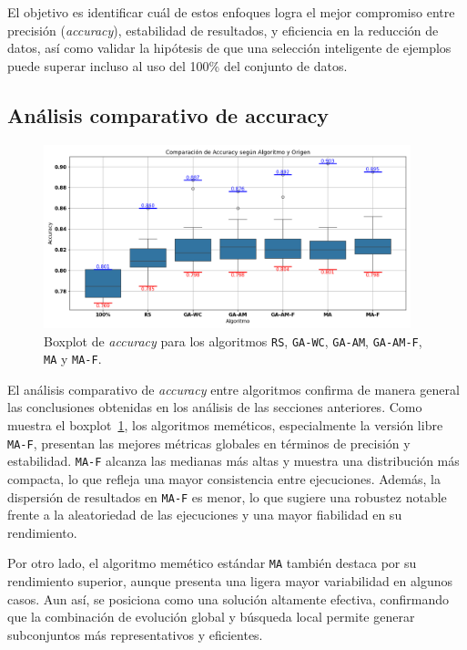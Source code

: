 El objetivo es identificar cuál de estos enfoques logra el mejor compromiso entre precisión (\textit{accuracy}),
estabilidad de resultados, y eficiencia en la reducción de datos, así como validar la hipótesis de que una selección inteligente de ejemplos puede superar incluso al uso del 100\% del conjunto de datos.

\subsection{Análisis comparativo de accuracy}\label{sec:comparacion-final-accuracy}
\begin{figure}[htp]
  \centering
  \includegraphics[width=0.95\textwidth]{imagenes/evaluaciones/final/boxplot-por-algoritmo.png}
  \caption{Boxplot de \textit{accuracy} para los algoritmos \texttt{RS}, \texttt{GA-WC}, \texttt{GA-AM}, \texttt{GA-AM-F}, \texttt{MA} y \texttt{MA-F}.}
  \label{fig:boxplot-comparacion-final}
\end{figure}
El análisis comparativo de \textit{accuracy} entre algoritmos confirma de manera general las conclusiones obtenidas en los análisis de las secciones anteriores.
Como muestra el boxplot~\ref{fig:boxplot-comparacion-final}, los algoritmos meméticos, especialmente la versión libre \texttt{MA-F},
presentan las mejores métricas globales en términos de precisión y estabilidad.
\texttt{MA-F} alcanza las medianas más altas y muestra una distribución más compacta, lo que refleja una mayor consistencia entre ejecuciones.
Además, la dispersión de resultados en \texttt{MA-F} es menor, lo que sugiere una robustez notable frente a la aleatoriedad de las ejecuciones y una mayor fiabilidad en su rendimiento.

Por otro lado, el algoritmo memético estándar \texttt{MA} también destaca por su rendimiento superior,
aunque presenta una ligera mayor variabilidad en algunos casos.
Aun así, se posiciona como una solución altamente efectiva,
confirmando que la combinación de evolución global y búsqueda local permite generar subconjuntos más representativos y eficientes.

